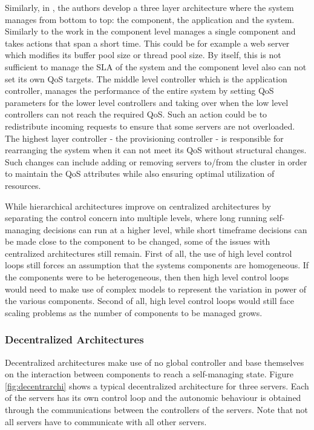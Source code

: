 Similarly, in \cite{related:architecture:hierarch2}, the authors develop a three layer architecture where the system manages from bottom to top: the component, the application and the system. Similarly to the work in \cite{Kramer:hierarch} the component level manages a single component and takes actions that span a short time. This could be for example a web server which modifies its buffer pool size or thread pool size. By itself, this is not sufficient to manage the SLA of the system and the component level also can not set its own QoS targets. The middle level controller which is the application controller, manages the performance of the entire system by setting QoS parameters for the lower level controllers and taking over when the low level controllers can not reach the required QoS. Such an action could be to redistribute incoming requests to ensure that some servers are not overloaded. The highest layer controller - the provisioning controller - is responsible for rearranging the system when it can not meet its QoS without structural changes. Such changes can include adding or removing servers to/from the cluster in order to maintain the QoS attributes while also ensuring optimal utilization of resources.

While hierarchical architectures improve on centralized architectures by separating the control concern into multiple levels, where long running self-managing decisions can run at a higher level, while short timeframe decisions can be made close to the component to be changed, some of the issues with centralized architectures still remain. First of all, the use of high level control loops still forces an assumption that the systems components are homogeneous. If the components were to be heterogeneous, then then high level control loops would need to make use of complex models to represent the variation in power of the various components. Second of all, high level control loops would still face scaling problems as the number of components to be managed grows.

\subsubsection{Decentralized Architectures}
\label{sect:decentralized}

Decentralized architectures make use of no global controller and base themselves on the interaction between components to reach a self-managing state. Figure \ref{fig:decentrarchi} shows a typical decentralized architecture for three servers. Each of the servers has its own control loop and the autonomic behaviour is obtained through the communications between the controllers of the servers. Note that not all servers have to communicate with all other servers.

